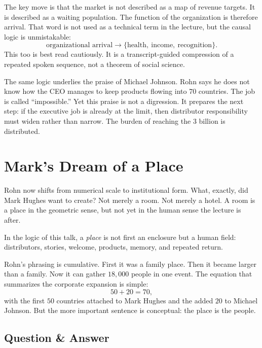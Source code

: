 The key move is that the market is not described as a map of revenue targets. It is described as a waiting population. The function of the organization is therefore arrival. That word is not used as a technical term in the lecture, but the causal logic is unmistakable:
\begin{equation}
\text{organizational arrival} \to \{\text{health},\ \text{income},\ \text{recognition}\}.
\end{equation}
This too is best read cautiously. It is a transcript-guided compression of a repeated spoken sequence, not a theorem of social science.

The same logic underlies the praise of Michael Johnson. Rohn says he does not know how the CEO manages to keep products flowing into 70 countries. The job is called ``impossible.'' Yet this praise is not a digression. It prepares the next step: if the executive job is already at the limit, then distributor responsibility must widen rather than narrow. The burden of reaching the 3 billion is distributed.

\section{Mark's Dream of a Place}

Rohn now shifts from numerical scale to institutional form. What, exactly, did Mark Hughes want to create? Not merely a room. Not merely a hotel. A room is a place in the geometric sense, but not yet in the human sense the lecture is after.

\begin{definition}
In the logic of this talk, a \emph{place} is not first an enclosure but a human field: distributors, stories, welcome, products, memory, and repeated return.
\end{definition}

Rohn's phrasing is cumulative. First it was a family place. Then it became larger than a family. Now it can gather \(18{,}000\) people in one event. The equation that summarizes the corporate expansion is simple:
\begin{equation}
50+20=70,
\end{equation}
with the first \(50\) countries attached to Mark Hughes and the added \(20\) to Michael Johnson. But the more important sentence is conceptual: the place is the people.

\subsection{Question \& Answer}


